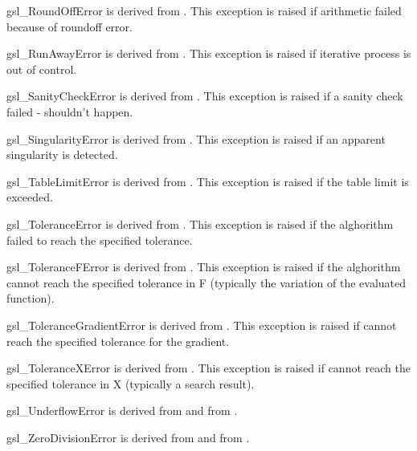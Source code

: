 \begin{excclassdesc}{gsl_RoundOffError}{}
is derived from   .
This exception is raised if  arithmetic failed because of roundoff error.
\end{excclassdesc}
\begin{excclassdesc}{gsl_RunAwayError}{}
is derived from   .
This exception is raised if   iterative process is out of control.
\end{excclassdesc}
\begin{excclassdesc}{gsl_SanityCheckError}{}
is derived from   .
This exception is raised if a sanity check failed - shouldn't happen.
\end{excclassdesc}
\begin{excclassdesc}{gsl_SingularityError}{}
is derived from   .
This exception is raised if  an   apparent singularity is detected.
\end{excclassdesc}
\begin{excclassdesc}{gsl_TableLimitError}{}
is derived from   .
This exception is raised if the table limit is exceeded.
\end{excclassdesc}
\begin{excclassdesc}{gsl_ToleranceError}{}
is derived from   .
This exception is raised if  the alghorithm failed to reach the specified tolerance.
\end{excclassdesc}
\begin{excclassdesc}{gsl_ToleranceFError}{}
is derived from   .
This exception is raised if  the alghorithm cannot reach the specified
tolerance in F (typically the variation of the evaluated function).
\end{excclassdesc}
\begin{excclassdesc}{gsl_ToleranceGradientError}{}
is derived from   .
This exception is raised if  cannot reach the specified tolerance for the gradient.
\end{excclassdesc}
\begin{excclassdesc}{gsl_ToleranceXError}{}
is derived from   .
This exception is raised if cannot reach the specified tolerance in X
(typically a search result).
\end{excclassdesc}
\begin{excclassdesc}{gsl_UnderflowError}{}
is derived from   and from   .
\end{excclassdesc}
\begin{excclassdesc}{gsl_ZeroDivisionError}{}
is derived from   and from   .
\end{excclassdesc}

